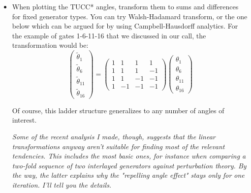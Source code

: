 \documentclass[10pt, a4paper]{article}
\begin{document}
\begin{itemize}
\item When plotting the TUCC* angles, transform them to sums and differences for fixed generator types. You can try Walsh-Hadamard transform, or the one below which can be argued for by using Campbell-Hausdorff analytics. For the example of gates 1-6-11-16 that we discussed in our call, the transformation would be:
\begin{equation}
\begin{pmatrix}
\tilde{\theta}_1 \\
\tilde{\theta}_6 \\
\tilde{\theta}_{11} \\
\tilde{\theta}_{16} 
\end{pmatrix}=\begin{pmatrix}
1 & 1 & 1 & 1\\
1 & 1 & 1 & -1\\
1 & 1 & -1 & -1 \\
1 & -1 & -1 & -1
\end{pmatrix}
\begin{pmatrix}
\theta_1 \\
\theta_6 \\
\theta_{11} \\
\theta_{16} 
\end{pmatrix}
\end{equation}

Of course, this ladder structure generalizes to any number of angles of interest.

\textit{Some of the recent analysis I made, though, suggests that the linear transformations anyway aren't suitable for finding most of the relevant tendencies. This includes the most basic ones, for instance when comparing a two-fold sequence of two interlayed generators against perturbation theory. By the way, the latter explains why the "repelling angle effect" stays only for one iteration. I'll tell you the details.}

\end{itemize}
\end{document}
